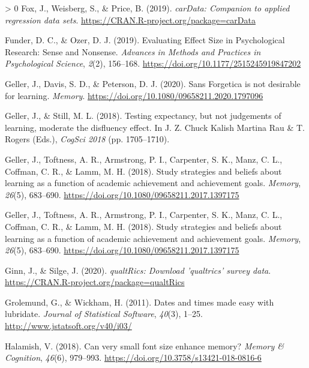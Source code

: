 \documentclass[
  english,
  jou]{apa7}
\newlength{\cslhangindent}
\newenvironment{CSLReferences}[3] %
 {%
  \setlength{\parindent}{0pt}
  \ifodd #1 \everypar{\setlength{\hangindent}{\cslhangindent}}\ignorespaces\fi
  \ifnum #2 > 0
  \setlength{\parskip}{#2\baselineskip}
  \fi
 }%
 {}
\begin{document}
\begin{CSLReferences}{1}{0}
\leavevmode\hypertarget{ref-R-carData}{}%
Fox, J., Weisberg, S., \& Price, B. (2019). \emph{carData: Companion to applied regression data sets}. \url{https://CRAN.R-project.org/package=carData}

\leavevmode\hypertarget{ref-Funder2019}{}%
Funder, D. C., \& Ozer, D. J. (2019). {Evaluating Effect Size in Psychological Research: Sense and Nonsense}. \emph{Advances in Methods and Practices in Psychological Science}, \emph{2}(2), 156--168. \url{https://doi.org/10.1177/2515245919847202}

\leavevmode\hypertarget{ref-Geller2020}{}%
Geller, J., Davis, S. D., \& Peterson, D. J. (2020). {Sans Forgetica is not desirable for learning}. \emph{Memory}. \url{https://doi.org/10.1080/09658211.2020.1797096}

\leavevmode\hypertarget{ref-cogsci18-Geller}{}%
Geller, J., \& Still, M. L. (2018). Testing expectancy, but not judgements of learning, moderate the disfluency effect. In J. Z. Chuck Kalish Martina Rau \& T. Rogers (Eds.), \emph{CogSci 2018} (pp. 1705--1710).

\leavevmode\hypertarget{ref-Geller2018}{}%
Geller, J., Toftness, A. R., Armstrong, P. I., Carpenter, S. K., Manz, C. L., Coffman, C. R., \& Lamm, M. H. (2018). {Study strategies and beliefs about learning as a function of academic achievement and achievement goals}. \emph{Memory}, \emph{26}(5), 683--690. \url{https://doi.org/10.1080/09658211.2017.1397175}

\leavevmode\hypertarget{ref-Geller2018}{}%
Geller, J., Toftness, A. R., Armstrong, P. I., Carpenter, S. K., Manz, C. L., Coffman, C. R., \& Lamm, M. H. (2018). {Study strategies and beliefs about learning as a function of academic achievement and achievement goals}. \emph{Memory}, \emph{26}(5), 683--690. \url{https://doi.org/10.1080/09658211.2017.1397175}

\leavevmode\hypertarget{ref-R-qualtRics}{}%
Ginn, J., \& Silge, J. (2020). \emph{qualtRics: Download 'qualtrics' survey data}. \url{https://CRAN.R-project.org/package=qualtRics}

\leavevmode\hypertarget{ref-R-lubridate}{}%
Grolemund, G., \& Wickham, H. (2011). Dates and times made easy with {lubridate}. \emph{Journal of Statistical Software}, \emph{40}(3), 1--25. \url{http://www.jstatsoft.org/v40/i03/}

\leavevmode\hypertarget{ref-Halamish2018}{}%
Halamish, V. (2018). {Can very small font size enhance memory?} \emph{Memory {\&} Cognition}, \emph{46}(6), 979--993. \url{https://doi.org/10.3758/s13421-018-0816-6}


\end{CSLReferences}
\end{document}
